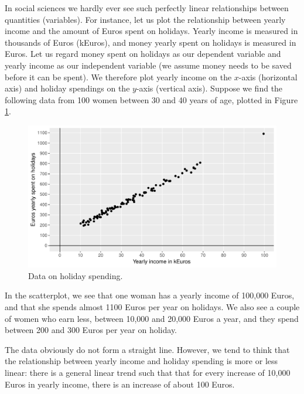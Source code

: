 \documentclass[]{book}\usepackage[]{graphicx}\usepackage[]{color}
\makeatletter
\def\maxwidth{ %
  \ifdim\Gin@nat@width>\linewidth
    \linewidth
  \else
    \Gin@nat@width
  \fi
}
\newenvironment{knitrout}{}{} %
\makeatother
\begin{document}
In social sciences we hardly ever see such perfectly linear relationships between quantities (variables). For instance, let us plot the relationship between yearly income and the amount of Euros spent on holidays. Yearly income is measured in thousands of Euros (kEuros), and money yearly spent on holidays is measured in Euros. Let us regard money spent on holidays as our dependent variable and yearly income as our independent variable (we assume money needs to be saved before it can be spent). We therefore plot yearly income on the $x$-axis (horizontal axis) and holiday spendings on the $y$-axis (vertical axis). Suppose we find the following data from 100 women between 30 and 40 years of age, plotted in Figure \ref{fig:lm_8}.


\begin{knitrout}
\color{fgcolor}\begin{figure}

{\centering \includegraphics[width=\maxwidth]{figure/lm_8-1} 

}

\caption[Data on holiday spending]{Data on holiday spending.}\label{fig:lm_8}
\end{figure}


\end{knitrout}

In the scatterplot, we see that one woman has a yearly income of 100,000 Euros, and that she spends almost 1100 Euros per year on holidays. We also see a couple of women who earn less, between 10,000 and 20,000 Euros a year, and they spend between 200 and 300 Euros per year on holiday.

The data obviously do not form a straight line. However, we tend to think that the relationship between yearly income and holiday spending is more or less linear: there is a general linear trend such that that for every increase of 10,000 Euros in yearly income, there is an increase of about 100 Euros.
\end{document}
